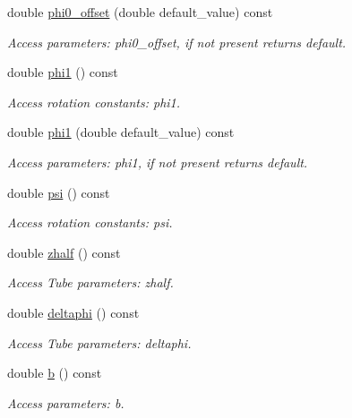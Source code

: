 \begin{DoxyCompactItemize}
double \hyperlink{struct_d_d4hep_1_1_x_m_l_1_1_child_value_a9ab4ff962b057440fd49f6207586b3ae}{phi0\+\_\+offset} (double default\+\_\+value) const
\begin{DoxyCompactList}\small\item\em Access parameters\+: phi0\+\_\+offset, if not present returns default. \end{DoxyCompactList}\item 
double \hyperlink{struct_d_d4hep_1_1_x_m_l_1_1_child_value_a84f8dd789adc1b93e4e1db7b57ebdad3}{phi1} () const
\begin{DoxyCompactList}\small\item\em Access rotation constants\+: phi1. \end{DoxyCompactList}\item 
double \hyperlink{struct_d_d4hep_1_1_x_m_l_1_1_child_value_a0cdd8daefd472f319ab214ac2f85534e}{phi1} (double default\+\_\+value) const
\begin{DoxyCompactList}\small\item\em Access parameters\+: phi1, if not present returns default. \end{DoxyCompactList}\item 
double \hyperlink{struct_d_d4hep_1_1_x_m_l_1_1_child_value_a69bf8ea626bca54aa3c016bdcf81ebb7}{psi} () const
\begin{DoxyCompactList}\small\item\em Access rotation constants\+: psi. \end{DoxyCompactList}\item 
double \hyperlink{struct_d_d4hep_1_1_x_m_l_1_1_child_value_a2e384dd38cff03a33d0f4715669442c2}{zhalf} () const
\begin{DoxyCompactList}\small\item\em Access Tube parameters\+: zhalf. \end{DoxyCompactList}\item 
double \hyperlink{struct_d_d4hep_1_1_x_m_l_1_1_child_value_ac94a76972641076217f5fcb112623891}{deltaphi} () const
\begin{DoxyCompactList}\small\item\em Access Tube parameters\+: deltaphi. \end{DoxyCompactList}\item 
double \hyperlink{struct_d_d4hep_1_1_x_m_l_1_1_child_value_ac0534f80c009548cbba3679c21d8a76d}{b} () const
\begin{DoxyCompactList}\small\item\em Access parameters\+: b. \end{DoxyCompactList}\item 

\end{DoxyCompactItemize}
